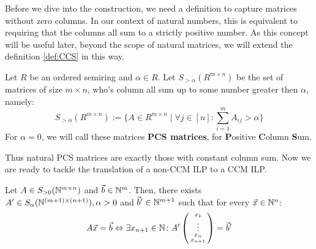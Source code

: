 Before we dive into the construction, we need a definition to capture matrices without zero columns. In our context of natural numbers, this is equivalent to requiring that the columns all sum to a strictly positive number. As this concept will be useful later, beyond the scope of natural matrices, we will extend the definition \ref{def:CCS} in this way.

\begin{definition}
    \label{def:PCS}
    Let $R$ be an ordered semiring and $\alpha \in R$. Let $S_{>\alpha}(R^{m \times n})$ be the set of matrices of size $m \times n$, who's column all sum up to some number greater then $\alpha$, namely:
    $$S_{>\alpha}(R^{m \times n}) := \{A \in R^{m \times n}\mid \forall j \in [n]\colon \sum_{i=1}^{m} A_{ij} > \alpha\}$$
    For $\alpha = 0$, we will call these matrices \textbf{PCS matrices}, for \textbf{P}ositive \textbf{C}olumn \textbf{S}um.
\end{definition}

Thus natural PCS matrices are exactly those with constant column sum. Now we are ready to tackle the translation of a non-CCM ILP to a CCM ILP.

\begin{theorem}
    \label{theorem:column_sum_construction}
    Let $A\in S_{>0}(\mathbb{N}^{m \times n})$ and $\vec b \in \mathbb{N}^m$. Then, there exists $A' \in S_\alpha(\mathbb{N}^{(m+1) \times (n+1)}), \alpha > 0$ and $\vec b' \in \mathbb{N}^{m+1}$ such that for every $\vec x \in \mathbb{N}^n$:
    $$A\vec x = \vec b \Leftrightarrow \exists x_{n+1}\in \mathbb{N}\colon A' \left(\begin{smallmatrix}
        x_1\\
        \vdots\\
        x_n\\
        x_{n+1}
    \end{smallmatrix}\right) = \vec b'$$
\end{theorem}

